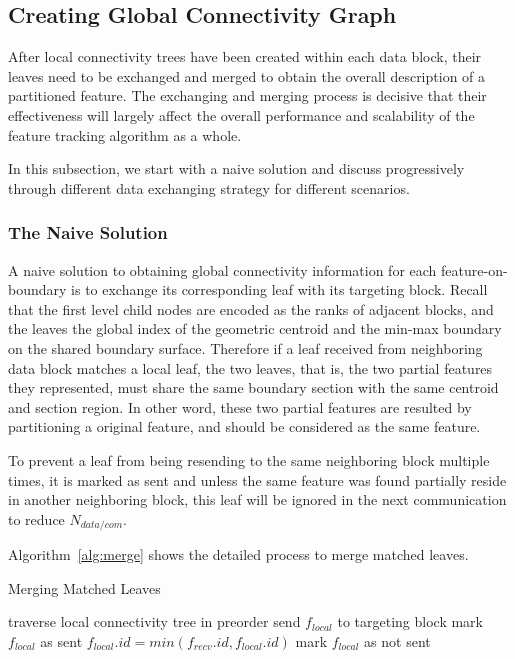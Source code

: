 \documentclass[10pt, conference, compsocconf]{IEEEtran}
\begin{document}
\subsection{Creating Global Connectivity Graph}

After local connectivity trees have been created within each data block, their leaves need to be exchanged and merged to obtain the overall description of a partitioned feature. The exchanging and merging process is decisive that their effectiveness will largely affect the overall performance and scalability of the feature tracking algorithm as a whole.

In this subsection, we start with a naive solution and discuss progressively through different data exchanging strategy for different scenarios.

\subsubsection{The Naive Solution}

A naive solution to obtaining global connectivity information for each feature-on-boundary is to exchange its corresponding leaf with its targeting block. Recall that the first level child nodes are encoded as the ranks of adjacent blocks, and the leaves the global index of the geometric centroid and the min-max boundary on the shared boundary surface. Therefore if a leaf received from neighboring data block matches a local leaf, the two leaves, that is, the two partial features they represented, must share the same boundary section with the same centroid and section region. In other word, these two partial features are resulted by partitioning a original feature, and should be considered as the same feature.

To prevent a leaf from being resending to the same neighboring block multiple times, it is marked as sent and unless the same feature was found partially reside in another neighboring block, this leaf will be ignored in the next communication to reduce $N_{data/com}$.

Algorithm~\ref{alg:merge} shows the detailed process to merge matched leaves.
\begin{algorithm}
\caption{Merging Matched Leaves}
\label{alg:merge}
\begin{algorithmic}
\STATE traverse local connectivity tree in preorder
		\STATE send $f_{local}$ to targeting block
	\ENDIF
	\STATE mark $f_{local}$ as sent
\ENDFOR
{}
			\STATE $f_{local}.id = min(f_{recv}.id, f_{local}.id)$
			\STATE mark $f_{local}$ as not sent
		\ENDIF
	\ENDFOR	
\ENDFOR
\end{algorithmic}
\end{algorithm}
\end{document}

